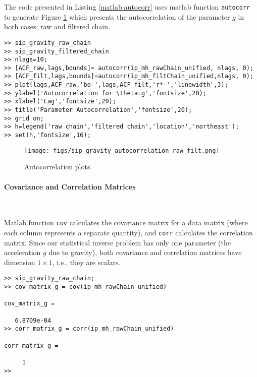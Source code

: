 The code presented in Listing \ref{matlab:autocorr} uses matlab function \verb+autocorr+ to generate Figure \ref{fig:sip_gravity_autocorrelation_raw_filt}
which presents the autocorrelation of the parameter $g$ in both cases: raw and filtered chain.

\begin{lstlisting}[label=matlab:autocorr,caption={Matlab code for the autocorrelation plots.}]
% inside Matlab
>> sip_gravity_raw_chain
>> sip_gravity_filtered_chain
>> nlags=10;
>> [ACF_raw,lags,bounds]= autocorr(ip_mh_rawChain_unified, nlags, 0);
>> [ACF_filt,lags,bounds]=autocorr(ip_mh_filtChain_unified,nlags, 0);
>> plot(lags,ACF_raw,'bo-',lags,ACF_filt,'r*-','linewidth',3);
>> ylabel('Autocorrelation for \theta=g','fontsize',20);
>> xlabel('Lag','fontsize',20);
>> title('Parameter Autocorrelation','fontsize',20);
>> grid on;
>> h=legend('raw chain','filtered chain','location','northeast');
>> set(h,'fontsize',16);
\end{lstlisting}

\begin{figure}[p]
\centering
\texttt{[image: figs/sip\_gravity\_autocorrelation\_raw\_filt.png]}
\vspace{-8pt}
\caption{
Autocorrelation plots. }
\label{fig:sip_gravity_autocorrelation_raw_filt}
\end{figure}

\paragraph{Covariance and Correlation Matrices}\

Matlab function \verb+cov+ calculates the covariance matrix for a data matrix (where each column represents a separate quantity), and \verb+corr+ calculates the correlation matrix.
Since our statistical inverse problem has only one parameter (the acceleration $g$ due to gravity), both covariance and correlation matrices have dimension $1 \times 1$, i.e., they are scalars.

\begin{lstlisting}[label=matlab:cov_matrix,caption={Matlab code for finding the covariance matrix.}]
% inside Matlab
>> sip_gravity_raw_chain;
>> cov_matrix_g = cov(ip_mh_rawChain_unified)
   
cov_matrix_g =

   6.8709e-04
>> corr_matrix_g = corr(ip_mh_rawChain_unified)

corr_matrix_g =

     1
>>
\end{lstlisting}

